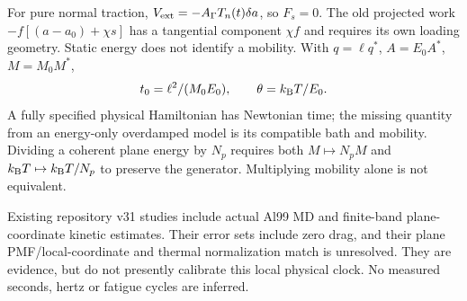 \documentclass[11pt]{article}
\newcommand{\kb}{k_{\rm B}}
\begin{document}
For pure normal traction,
$V_{\rm ext}=-A_\Gamma T_n(t)\delta a$, so $F_s=0$.
The old projected work $-f[(a-a_0)+\chi s]$ has a tangential component
$\chi f$ and requires its own loading geometry. Static energy does not
identify a mobility. With $q=\ell q^*$, $A=E_0A^*$, $M=M_0M^*$,
\begin{equation}
t_0=\ell^2/(M_0E_0),\qquad\theta=\kb T/E_0.
\end{equation}
A fully specified physical Hamiltonian has Newtonian time; the missing
quantity from an energy-only overdamped model is its compatible bath and
mobility. Dividing a coherent plane energy by $N_p$ requires both
$M\mapsto N_pM$ and $\kb T\mapsto\kb T/N_p$ to preserve the generator.
Multiplying mobility alone is not equivalent.

Existing repository v31 studies include actual Al99 MD and finite-band
plane-coordinate kinetic estimates. Their error sets include zero drag,
and their plane PMF/local-coordinate and thermal normalization match is
unresolved. They are evidence, but do not presently calibrate this local
physical clock. No measured seconds, hertz or fatigue cycles are inferred.
\end{document}
